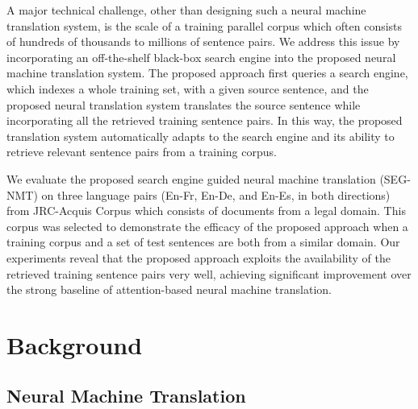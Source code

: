 A major technical challenge, other than designing such a neural machine translation system, is the scale of a training parallel corpus which often consists of hundreds of thousands to millions of sentence pairs. We address this issue by incorporating an off-the-shelf black-box search engine into the proposed neural machine translation system. The proposed approach first queries a search engine, which indexes a whole training set, with a given source sentence, and the proposed neural translation system translates the source sentence while incorporating all the retrieved training sentence pairs. In this way, the proposed translation system automatically adapts to the search engine and its ability to retrieve relevant sentence pairs from a training corpus.

We evaluate the proposed search engine guided neural machine translation (SEG-NMT) on three language pairs (En-Fr, En-De, and En-Es, in both directions) from JRC-Acquis Corpus\citep{steinberger2006jrc} which consists of documents from a legal domain. This corpus was selected to demonstrate the efficacy of the proposed approach when a training corpus and a set of test sentences are both from a similar domain. Our experiments reveal that the proposed approach exploits the availability of the retrieved training sentence pairs very well, achieving significant improvement over the strong baseline of attention-based neural machine translation\citep{bahdanau2014neural}.




\section{Background}

\subsection{Neural Machine Translation}

